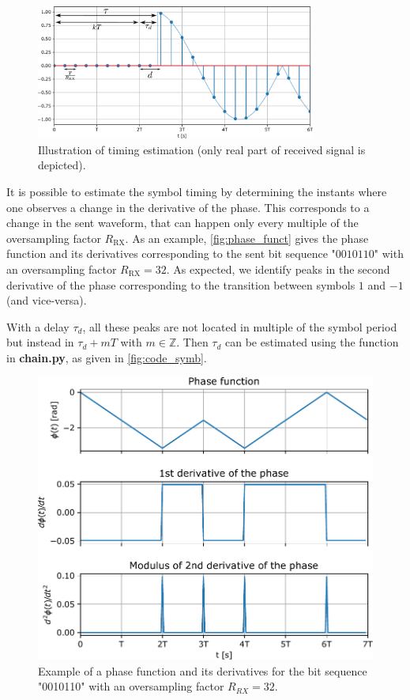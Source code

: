 \begin{figure}[H]
    \centering
    \includegraphics[width=0.82\textwidth]{figures/drawing_timing.pdf}
    \caption{Illustration of timing estimation (only real part of received signal is depicted).}
    \label{fig:timing_ex}
\end{figure}

It is possible to estimate the symbol timing by determining the instants where one observes a change in the derivative of the phase. This corresponds to a change in the sent waveform, that can happen only every multiple of the oversampling factor $R_{\text{RX}}$. As an example, \autoref{fig:phase_funct} gives the phase function and its derivatives corresponding to the sent bit sequence "$0010110$" with an oversampling factor $R_{\text{RX}}=32$. As expected, we identify peaks in the second derivative of the phase corresponding to the transition between symbols $1$ and $-1$ (and vice-versa).

With a delay $\tau_d$, all these peaks are not located in multiple of the symbol period but instead in $\tau_d+m T$ with $m\in \mathbb{Z}$. Then $\tau_d$ can be estimated using the function  in \textbf{chain.py}, as given in \autoref{fig:code_symb}.

\begin{figure}[H]
    \centering
    \includegraphics[scale=0.75]{figures/phase_function_bis.pdf}
    \caption{Example of a phase function and its derivatives for the bit sequence "0010110" with an oversampling factor $R_{RX}=32$.}
    \label{fig:phase_funct}
\end{figure}




